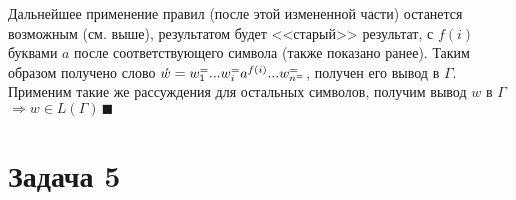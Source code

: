 \documentclass[a4paper]{article}
\begin{document}
\begin{itemize}
\begin{enumerate}
\end{enumerate}
Дальнейшее применение правил (после этой измененной части) останется возможным (см. выше), результатом будет <<старый>> результат, с $f(i)$ буквами $a$ после соответствующего символа (также показано ранее).\newline
Таким образом получено слово $\acute{w}=w^=_1...w^=_ia^{f(i)}...w^=_{n^=}$, получен его вывод в $\Gamma$. Применим такие же рассуждения для остальных символов, получим вывод $w$ в $\Gamma$ $\Rightarrow w\in L(\Gamma)\,\blacksquare$
\end{itemize}
\section*{Задача 5}
\end{document}
